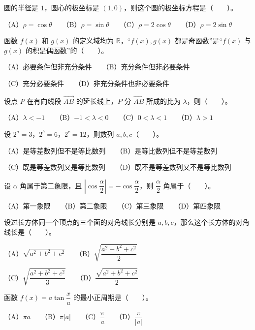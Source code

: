 \begin{question}
圆的半径是 $1$，圆心的极坐标是 $(1,0)$，则这个圆的极坐标方程是\mbox{（　　）}。

（A）$\rho=\cos\theta$　　（B）$\rho=\sin\theta$　　（C）$\rho=2\cos\theta$　　（D）$\rho=2\sin\theta$

\end{question}
\begin{question}
函数 $f(x)$ 和 $g(x)$ 的定义域均为 $\mathbb R$，“$f(x),g(x)$ 都是奇函数”是“$f(x)$ 与 $g(x)$ 的积是偶函数”的\mbox{（　　）}。

（A）必要条件但非充分条件　　（B）充分条件但非必要条件

（C）充分必要条件　　（D）非充分条件也非必要条件

\end{question}
\begin{question}
设点 $P$ 在有向线段 $\overrightarrow{AB}$ 的延长线上，$P$ 分 $\overrightarrow{AB}$ 所成的比为 $\lambda$，则\mbox{（　　）}。

（A）$\lambda<-1$　　（B）$-1<\lambda<0$　　（C）$0<\lambda<1$　　（D）$\lambda>1$

\end{question}
\begin{question}
设 $2^a=3$，$2^b=6$，$2^c=12$，则数列 $a,b,c$\mbox{（　　）}。

（A）是等差数列但不是等比数列　　（B）是等比数列但不是等差数列

（C）既是等差数列又是等比数列　　（D）既不是等差数列又不是等比数列

\end{question}
\begin{question}
设 $\alpha$ 角属于第二象限，且 $\left|\cos\dfrac\alpha2\right|=-\cos\dfrac\alpha2$，则 $\dfrac\alpha2$ 角属于\mbox{（　　）}。

（A）第一象限　　（B）第二象限　　（C）第三象限　　（D）第四象限

\end{question}
\begin{question}
设过长方体同一个顶点的三个面的对角线长分别是 $a,b,c$，那么这个长方体的对角线长是\mbox{（　　）}。

（A）$\sqrt{a^2+b^2+c^2}$　　（B）$\sqrt{\dfrac{a^2+b^2+c^2}{2}}$

（C）$\sqrt{\dfrac{a^2+b^2+c^2}{3}}$　　（D）$\dfrac{\sqrt{a^2+b^2+c^2}}{2}$

\end{question}
\begin{question}
函数 $f(x)=a\tan\dfrac xa$ 的最小正周期是\mbox{（　　）}。

（A）$\pi a$　　（B）$\pi|a|$　　（C）$\dfrac\pi a$　　（D）$\dfrac\pi{|a|}$

\end{question}
